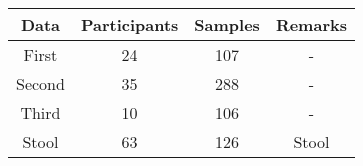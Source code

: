 \begin{tabular}{c|ccc}
    Data & Participants & Samples & Remarks \\ \hline
    First & 24 & 107 & - \\
    Second & 35 & 288 & - \\
    Third & 10 & 106 & - \\
    Stool & 63 & 126 & Stool \\
\end{tabular}
